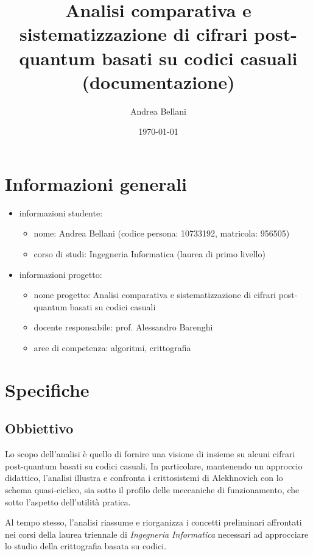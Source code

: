 \documentclass[12pt, a4paper]{report}
\theoremstyle{definition}
\begin{document}
	\addtocounter{chapter}{-1}
	\title{Analisi comparativa e sistematizzazione di cifrari post-quantum basati su codici casuali (documentazione)}
	\author{Andrea Bellani}
	\date{\today}
	
	\maketitle
	
	\tableofcontents
	
	\chapter{Informazioni generali}
		\begin{itemize}
			\item informazioni studente:
				\begin{itemize}
					\item nome: Andrea Bellani (codice persona: 10733192, matricola: 956505)
					\item corso di studi: Ingegneria Informatica (laurea di primo livello)
				\end{itemize}
			\item informazioni progetto:
				\begin{itemize}
					\item nome progetto: Analisi comparativa e sistematizzazione di cifrari post-quantum basati su codici casuali
					\item docente responsabile: prof. Alessandro Barenghi
					\item aree di competenza: algoritmi, crittografia
				\end{itemize}
		\end{itemize}
	\chapter{Specifiche}
		\section{Obbiettivo}
			Lo scopo dell'analisi è quello di fornire una visione di insieme su alcuni cifrari post-quantum basati su codici casuali. In particolare, mantenendo un approccio didattico, l'analisi illustra e confronta i crittosistemi di Alekhnovich con lo schema quasi-ciclico, sia sotto il profilo delle meccaniche di funzionamento, che sotto l'aspetto dell'utilità pratica.
			
			Al tempo stesso, l'analisi riassume e riorganizza i concetti preliminari affrontati nei corsi della laurea triennale di \emph{Ingegneria Informatica} necessari ad approcciare lo studio della crittografia basata su codici.
\end{document}
